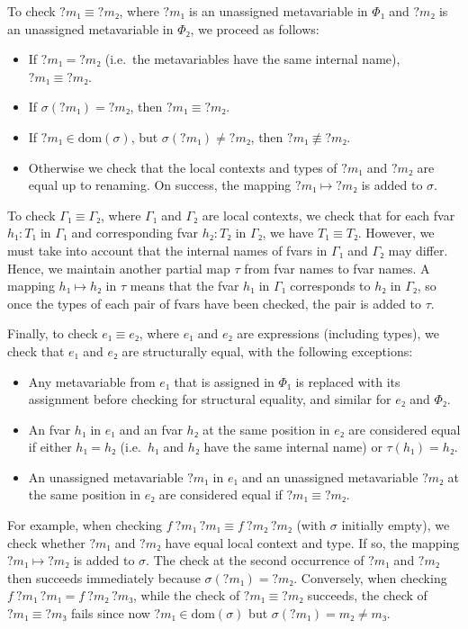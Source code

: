 \documentclass[sigplan,screen]{acmart}
\newcommand{\mvar}[1]{{?#1}}
\newcommand{\dom}{\ensuremath{\mathrm{dom}}}
\begin{document}
To check $\mvar{m₁} ≡ \mvar{m₂}$, where $\mvar{m₁}$ is an unassigned metavariable in $Φ₁$ and $\mvar{m₂}$ is an unassigned metavariable in $Φ₂$, we proceed as follows:
\begin{itemize}
  \item If $\mvar{m₁} = \mvar{m₂}$ (i.e.\ the metavariables have the same internal name), $\mvar{m₁} ≡ \mvar{m₂}$.
  \item If $σ(\mvar{m₁}) = \mvar{m₂}$, then $\mvar{m₁} ≡ \mvar{m₂}$.
  \item If $\mvar{m₁} ∈ \dom(σ)$, but $σ(\mvar{m₁}) ≠ \mvar{m₂}$, then $\mvar{m₁} ≢ \mvar{m₂}$.
  \item Otherwise we check that the local contexts and types of $\mvar{m₁}$ and $\mvar{m₂}$ are equal up to renaming.
        On success, the mapping $\mvar{m₁} ↦ \mvar{m₂}$ is added to $σ$.
\end{itemize}

To check $Γ₁ ≡ Γ₂$, where $Γ₁$ and $Γ₂$ are local contexts, we check that for each fvar $h₁ : T₁$ in $Γ₁$ and corresponding fvar $h₂ : T₂$ in $Γ₂$, we have $T₁ ≡ T₂$.
However, we must take into account that the internal names of fvars in $Γ₁$ and $Γ₂$ may differ.
Hence, we maintain another partial map $τ$ from fvar names to fvar names.
A mapping $h₁ ↦ h₂$ in $τ$ means that the fvar $h₁$ in $Γ₁$ corresponds to $h₂$ in $Γ₂$, so once the types of each pair of fvars have been checked, the pair is added to $τ$.

Finally, to check $e₁ ≡ e₂$, where $e₁$ and $e₂$ are expressions (including types), we check that $e₁$ and $e₂$ are structurally equal, with the following exceptions:
\begin{itemize}
  \item Any metavariable from $e₁$ that is assigned in $Φ₁$ is replaced with its assignment before checking for structural equality, and similar for $e₂$ and $Φ₂$.
  \item An fvar $h₁$ in $e₁$ and an fvar $h₂$ at the same position in $e₂$ are considered equal if either $h₁ = h₂$ (i.e.\ $h₁$ and $h₂$ have the same internal name) or $τ(h₁) = h₂$.
  \item An unassigned metavariable $\mvar{m₁}$ in $e₁$ and an unassigned metavariable $\mvar{m₂}$ at the same position in $e₂$ are considered equal if $\mvar{m₁} ≡ \mvar{m₂}$.
\end{itemize}

For example, when checking $f~\mvar{m₁}~\mvar{m₁} ≡ f~\mvar{m₂}~\mvar{m₂}$ (with $σ$ initially empty), we check whether $\mvar{m₁}$ and $\mvar{m₂}$ have equal local context and type.
If so, the mapping $\mvar{m₁} ↦ \mvar{m₂}$ is added to $σ$.
The check at the second occurrence of $\mvar{m₁}$ and $\mvar{m₂}$ then succeeds immediately because $σ(\mvar{m₁}) = \mvar{m₂}$.
Conversely, when checking $f~\mvar{m₁}~\mvar{m₁} = f~\mvar{m₂}~\mvar{m₃}$, while the check of $\mvar{m₁} ≡ \mvar{m₂}$ succeeds, the check of $\mvar{m₁} ≡ \mvar{m₃}$ fails since now $\mvar{m₁} ∈ \dom(σ)$ but $σ(\mvar{m₁}) = m₂ ≠ m₃$.
\end{document}
